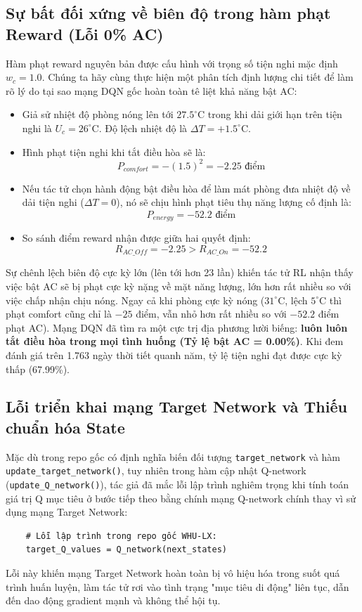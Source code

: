 \documentclass[12pt, a4paper]{article}
\begin{document}
\subsection{Sự bất đối xứng về biên độ trong hàm phạt Reward (Lỗi 0\% AC)}
Hàm phạt reward nguyên bản được cấu hình với trọng số tiện nghi mặc định $w_c = 1.0$. Chúng ta hãy cùng thực hiện một phân tích định lượng chi tiết để làm rõ lý do tại sao mạng DQN gốc hoàn toàn tê liệt khả năng bật AC:
\begin{itemize}
    \item Giả sử nhiệt độ phòng nóng lên tới $27.5^\circ\text{C}$ trong khi dải giới hạn trên tiện nghi là $U_c = 26^\circ\text{C}$. Độ lệch nhiệt độ là $\Delta T = +1.5^\circ\text{C}$.
    \item Hình phạt tiện nghi khi tắt điều hòa sẽ là:
    \begin{equation}
    P_{comfort} = -(1.5)^2 = -2.25 \text{ điểm}
    \end{equation}
    \item Nếu tác tử chọn hành động bật điều hòa để làm mát phòng đưa nhiệt độ về dải tiện nghi ($\Delta T = 0$), nó sẽ chịu hình phạt tiêu thụ năng lượng cố định là:
    \begin{equation}
    P_{energy} = -52.2 \text{ điểm}
    \end{equation}
    \item So sánh điểm reward nhận được giữa hai quyết định:
    \begin{equation}
    R_{AC\_Off} = -2.25 > R_{AC\_On} = -52.2
    \end{equation}
\end{itemize}
Sự chênh lệch biên độ cực kỳ lớn (lên tới hơn 23 lần) khiến tác tử RL nhận thấy việc bật AC sẽ bị phạt cực kỳ nặng về mặt năng lượng, lớn hơn rất nhiều so với việc chấp nhận chịu nóng. Ngay cả khi phòng cực kỳ nóng ($31^\circ\text{C}$, lệch $5^\circ\text{C}$ thì phạt comfort cũng chỉ là $-25$ điểm, vẫn nhỏ hơn rất nhiều so với $-52.2$ điểm phạt AC). Mạng DQN đã tìm ra một cực trị địa phương lười biếng: \textbf{luôn luôn tắt điều hòa trong mọi tình huống (Tỷ lệ bật AC = 0.00\%)}. Khi đem đánh giá trên 1.763 ngày thời tiết quanh năm, tỷ lệ tiện nghi đạt được cực kỳ thấp (67.99\%).

\subsection{Lỗi triển khai mạng Target Network và Thiếu chuẩn hóa State}
Mặc dù trong repo gốc có định nghĩa biến đối tượng \texttt{target\_network} và hàm \texttt{update\_target\_network()}, tuy nhiên trong hàm cập nhật Q-network (\texttt{update\_Q\_network()}), tác giả đã mắc lỗi lập trình nghiêm trọng khi tính toán giá trị Q mục tiêu ở bước tiếp theo bằng chính mạng Q-network chính thay vì sử dụng mạng Target Network:
\begin{verbatim}
    # Lỗi lập trình trong repo gốc WHU-LX:
    target_Q_values = Q_network(next_states)
\end{verbatim}
Lỗi này khiến mạng Target Network hoàn toàn bị vô hiệu hóa trong suốt quá trình huấn luyện, làm tác tử rơi vào tình trạng "mục tiêu di động" liên tục, dẫn đến dao động gradient mạnh và không thể hội tụ. 
\end{document}
